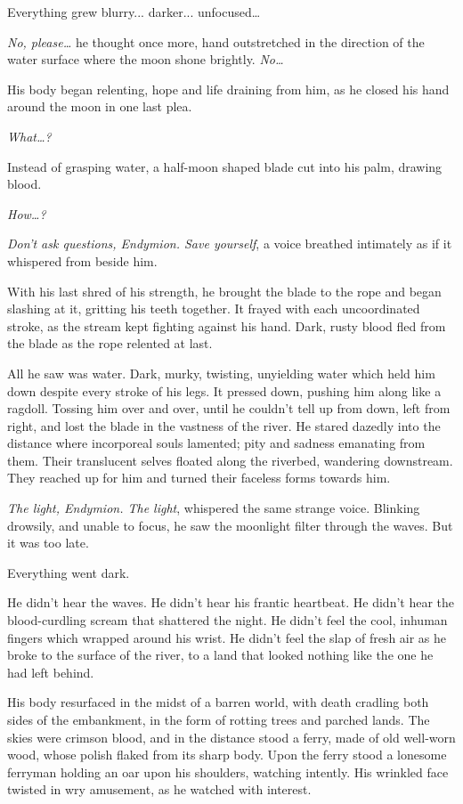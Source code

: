 Everything grew blurry... darker... unfocused…

\emph{No, please…} he thought once more, hand outstretched in the direction of the water surface where the moon shone brightly. \emph{No…}

His body began relenting, hope and life draining from him, as he closed his hand around the moon in one last plea.

\emph{What…?}

Instead of grasping water, a half-moon shaped blade cut into his palm, drawing blood.

\emph{How…?}

\emph{Don’t ask questions, Endymion. Save yourself}, a voice breathed intimately as if it whispered from beside him.

With his last shred of his strength, he brought the blade to the rope and began slashing at it, gritting his teeth together. It frayed with each uncoordinated stroke, as the stream kept fighting against his hand. Dark, rusty blood fled from the blade as the rope relented at last.

All he saw was water. Dark, murky, twisting, unyielding water which held him down despite every stroke of his legs. It pressed down, pushing him along like a ragdoll. Tossing him over and over, until he couldn’t tell up from down, left from right, and lost the blade in the vastness of the river. He stared dazedly into the distance where incorporeal souls lamented; pity and sadness emanating from them. Their translucent selves floated along the riverbed, wandering downstream. They reached up for him and turned their faceless forms towards him.

\emph{The light, Endymion. The light}, whispered the same strange voice. Blinking drowsily, and unable to focus, he saw the moonlight filter through the waves. But it was too late.

Everything went dark. 

He didn’t hear the waves. He didn’t hear his frantic heartbeat. He didn’t hear the blood-curdling scream that shattered the night. He didn’t feel the cool, inhuman fingers which wrapped around his wrist. He didn’t feel the slap of fresh air as he broke to the surface of the river, to a land that looked nothing like the one he had left behind.

His body resurfaced in the midst of a barren world, with death cradling both sides of the embankment, in the form of rotting trees and parched lands. The skies were crimson blood, and in the distance stood a ferry, made of old well-worn wood, whose polish flaked from its sharp body. Upon the ferry stood a lonesome ferryman holding an oar upon his shoulders, watching intently. His wrinkled face twisted in wry amusement, as he watched with interest.

